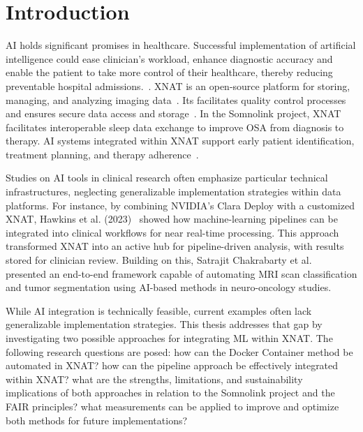 

\chapter{Introduction}

\ac{AI} holds significant promises in healthcare. Successful implementation of artificial intelligence could ease clinician's workload, enhance diagnostic accuracy and enable the patient to take more control of their healthcare, thereby reducing preventable hospital admissions.~\cite{aung_promise_2021}. XNAT is an open-source platform for storing, managing, and analyzing imaging data~\cite{xnat_about}. Its facilitates quality control processes and ensures secure data access and storage~\cite{marcus_extensible_2007}. In the Somnolink project, XNAT facilitates interoperable sleep data exchange to improve \ac{OSA} from diagnosis to therapy. AI systems integrated within XNAT support early patient identification, treatment planning, and therapy  adherence~\cite{SOMNOLINK}.

Studies on AI tools in clinical research often emphasize particular technical infrastructures, neglecting generalizable implementation strategies within data platforms. For instance, by combining NVIDIA’s Clara Deploy with a customized XNAT, Hawkins et al. (2023)~\cite{hawkins_implementation_2023} showed how machine-learning pipelines can be integrated into clinical workflows for near real-time processing. This approach transformed XNAT into an active hub for pipeline-driven analysis, with results stored for clinician review. Building on this, Satrajit Chakrabarty et al.~\cite{chakrabarty_deep_2023} presented an end-to-end framework capable of automating \ac{MRI} scan classification and tumor segmentation using AI-based methods in neuro-oncology studies. 

While AI integration is technically feasible, current examples often lack generalizable implementation strategies. 
This thesis addresses that gap by investigating two possible approaches for integrating \ac{ML} within XNAT. The following research questions are posed: how can the Docker Container method be automated in XNAT? how can the pipeline approach be effectively integrated within XNAT? what are the strengths, limitations, and sustainability implications of both approaches in relation to the Somnolink project and the FAIR principles? what measurements can be applied to improve and optimize both methods for future implementations?






 

